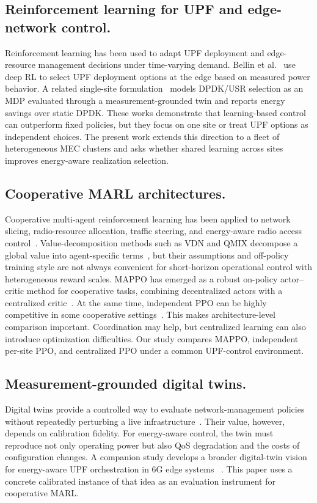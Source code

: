 \documentclass[10pt,conference,letterpaper]{IEEEtran}
\begin{document}
\subsection{Reinforcement learning for UPF and edge-network control.}
Reinforcement learning has been used to adapt UPF deployment and edge-resource
management decisions under time-varying demand. Bellin et al.~\cite{ref:bellin}
use deep RL to select UPF deployment options at the edge based on measured power
behavior. A related single-site formulation~\cite{ref:comcom} models DPDK/USR
selection as an MDP evaluated through a measurement-grounded twin and reports
energy savings over static DPDK. These works demonstrate that learning-based
control can outperform fixed policies, but they focus on one site or treat UPF
options as independent choices. The present work extends this direction to a
fleet of heterogeneous MEC clusters and asks whether shared learning across
sites improves energy-aware realization selection.

\subsection{Cooperative MARL architectures.}
Cooperative multi-agent reinforcement learning has been applied to network
slicing, radio-resource allocation, traffic steering, and energy-aware radio
access control~\cite{ref:zhu,ref:cai}. Value-decomposition methods such as VDN
and QMIX decompose a global value into agent-specific terms~\cite{ref:vdn,ref:qmix},
but their assumptions and off-policy training style are not always convenient
for short-horizon operational control with heterogeneous reward scales. MAPPO
has emerged as a robust on-policy actor--critic method for cooperative tasks,
combining decentralized actors with a centralized critic~\cite{ref:mappo}. At
the same time, independent PPO can be highly competitive in some cooperative
settings~\cite{ref:ippo}. This makes architecture-level comparison important.
Coordination may help, but centralized learning can also introduce optimization
difficulties. Our study compares MAPPO, independent per-site PPO, and centralized
PPO under a common UPF-control environment.
\subsection{Measurement-grounded digital twins.}
Digital twins provide a controlled way to evaluate network-management policies
without repeatedly perturbing a live infrastructure~\cite{ref:ndt}. Their value,
however, depends on calibration fidelity. For energy-aware control, the twin
must reproduce not only operating power but also QoS degradation and the
costs of configuration changes. A companion study develops a broader
digital-twin vision for energy-aware UPF orchestration in 6G edge systems
~\cite{ref:costandt}. This paper uses a concrete calibrated instance of that
idea as an evaluation instrument for cooperative MARL.
\end{document}
